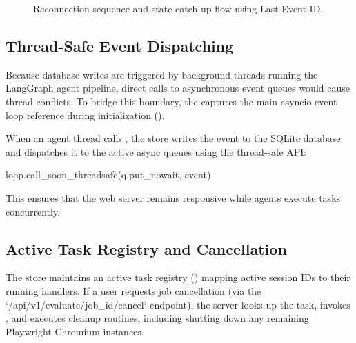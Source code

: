 \begin{figure}[htbp]
  \centering
  \caption{Reconnection sequence and state catch-up flow using Last-Event-ID.}
  \label{fig:reconnection-flow}
\end{figure}

\subsection{Thread-Safe Event Dispatching}
\label{sec:thread-safe-dispatching}

Because database writes are triggered by background threads running the LangGraph agent pipeline, direct calls to asynchronous event queues would cause thread conflicts. To bridge this boundary, the  captures the main asyncio event loop reference during initialization (). 

When an agent thread calls , the store writes the event to the SQLite database and dispatches it to the active async queues using the thread-safe API:

\begin{code}
loop.call_soon_threadsafe(q.put_nowait, event)
\end{code}

This ensures that the web server remains responsive while agents execute tasks concurrently.

\subsection{Active Task Registry and Cancellation}
\label{sec:task-registry}

The store maintains an active task registry () mapping active session IDs to their running  handlers. If a user requests job cancellation (via the `/api/v1/evaluate/{job_id}/cancel` endpoint), the server looks up the task, invokes , and executes cleanup routines, including shutting down any remaining Playwright Chromium instances.


